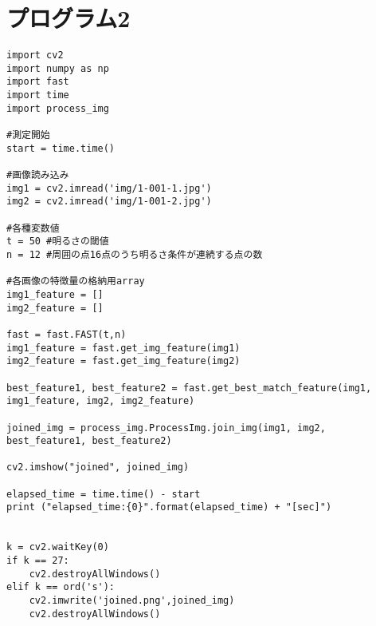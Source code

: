 \section{プログラム2}
\begin{lstlisting}[caption=FASTのテスト用プログラム]
import cv2
import numpy as np
import fast
import time
import process_img
    
#測定開始
start = time.time()
    
#画像読み込み
img1 = cv2.imread('img/1-001-1.jpg')
img2 = cv2.imread('img/1-001-2.jpg')
    
#各種変数値
t = 50 #明るさの閾値
n = 12 #周囲の点16点のうち明るさ条件が連続する点の数
    
#各画像の特徴量の格納用array
img1_feature = []
img2_feature = []
    
fast = fast.FAST(t,n)
img1_feature = fast.get_img_feature(img1)
img2_feature = fast.get_img_feature(img2)
    
best_feature1, best_feature2 = fast.get_best_match_feature(img1, img1_feature, img2, img2_feature)
    
joined_img = process_img.ProcessImg.join_img(img1, img2, best_feature1, best_feature2)
    
cv2.imshow("joined", joined_img)
    
elapsed_time = time.time() - start
print ("elapsed_time:{0}".format(elapsed_time) + "[sec]")
       
        
k = cv2.waitKey(0)
if k == 27:         
    cv2.destroyAllWindows()
elif k == ord('s'): 
    cv2.imwrite('joined.png',joined_img)
    cv2.destroyAllWindows()

\end{lstlisting}
